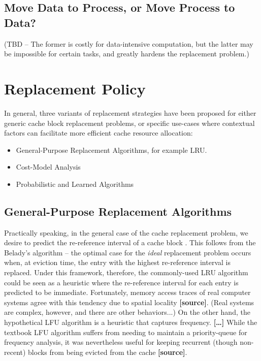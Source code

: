 \documentclass{article}
\begin{document}
\subsection{Move Data to Process, or Move Process to Data?}
(TBD -- The former is costly for data-intensive computation, but the latter may
be impossible for certain tasks, and greatly hardens the replacement problem.)

\section{Replacement Policy}

In general, three variants of replacement strategies have been proposed for either
generic cache block replacement problems, or specific use-cases where contextual
factors can facilitate more efficient cache resource allocation:
\begin{itemize}
    \item General-Purpose Replacement Algorithms, for example LRU.
    \item Cost-Model Analysis
    \item Probabilistic and Learned Algorithms
\end{itemize}

\subsection{General-Purpose Replacement Algorithms}
Practically speaking, in the general case of the cache replacement problem,
we desire to predict the re-reference interval of a cache block
\cite{Jaleel_etal.RRIP.2010}. This follows from the Belady's algorithm -- the
optimal case for the \emph{ideal} replacement problem occurs when, at eviction
time, the entry with the highest re-reference interval is replaced. Under this
framework, therefore, the commonly-used LRU algorithm could be seen as a heuristic
where the re-reference interval for each entry is predicted to be immediate.
Fortunately, memory access traces of real computer systems agree with this
tendency due to spatial locality \textbf{[source]}. (Real systems are complex,
however, and there are other behaviors...) On the other hand, the hypothetical
LFU algorithm is a heuristic that captures frequency. \textbf{[\dots]} While the
textbook LFU algorithm suffers from needing to maintain a priority-queue for
frequency analysis, it was nevertheless useful for keeping recurrent (though
non-recent) blocks from being evicted from the cache \textbf{[source]}.
\end{document}
